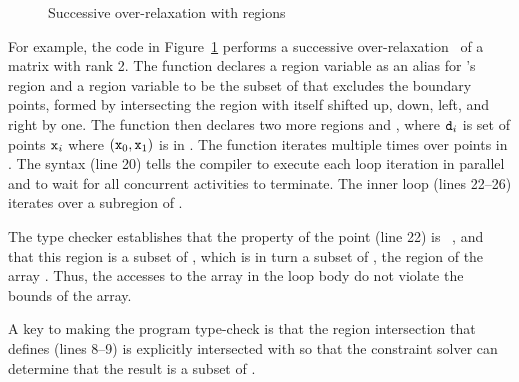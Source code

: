 \begin{figure}[t]
\footnotesize


\caption{Successive over-relaxation with regions}
\label{fig:sor}
\end{figure}

For example, the code in Figure~\ref{fig:sor} performs a successive
over-relaxation~\cite{sor} of a matrix  with rank 2.
The function declares a region variable  as an alias for
's region and a region variable  to be 
the subset of  that excludes the boundary points,
formed by intersecting the  region with itself shifted up, down,
left, and right by one.
The function then declares two more regions  and ,
where ${\tt d}_i$ is set of points ${\tt x}_i$ where
$({\tt x}_0, {\tt x}_1)$ is in .  The function
iterates multiple times over points  in .
The syntax   (line 20) tells the
compiler to execute each loop iteration in parallel and to wait
for all concurrent activities to terminate.
The inner loop (lines 22--26) iterates over a subregion of
.

The type checker establishes that the  property of
the point  (line 22) is 
\xcd{&}~, and that this region is a
subset of , which is in turn a subset of ,
the region of the array .
Thus, the accesses to the array in the loop body
do not violate the bounds of the array.

A key to making the program type-check is that the region
intersection that defines  (lines 8--9)
is explicitly intersected with  so that the 
constraint solver can determine that
the result is a subset of .


